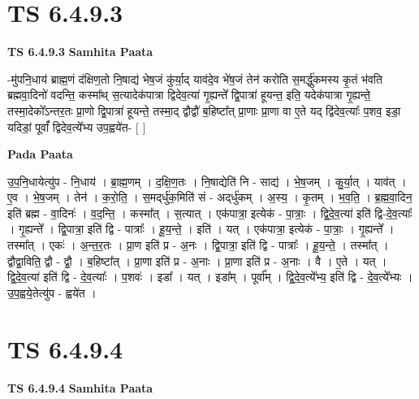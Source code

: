 \documentclass[17pt]{extarticle}
\begin{document}
\section*{ TS 6.4.9.3 }

\textbf{TS 6.4.9.3 } \newline
\textbf{Samhita Paata} \newline

-मु॑पनि॒धाय॑ ब्राह्म॒णं द॑क्षिण॒तो नि॒षाद्य॑ भेष॒जं कु॑र्या॒द् याव॑दे॒व भे॑ष॒जं तेन॑ करोति स॒मर्द्धु॑कमस्य कृ॒तं भ॑वति ब्रह्मवा॒दिनो॑ वदन्ति॒  कस्मा᳚थ् स॒त्यादेक॑पात्रा द्विदेव॒त्या॑ गृ॒ह्यन्ते᳚ द्वि॒पात्रा॑ हूयन्त॒ इति॒ यदेक॑पात्रा गृ॒ह्यन्ते॒ तस्मा॒देको᳚ऽन्तर॒तः प्रा॒णो द्वि॒पात्रा॑ हूयन्ते॒ तस्मा॒द् द्वौद्वौ॑ ब॒हिष्टा᳚त् प्रा॒णाः प्रा॒णा वा ए॒ते यद् द्वि॑देव॒त्याः᳚ प॒शव॒ इडा॒ यदिडां॒ पूर्वां᳚ द्विदेव॒त्ये᳚भ्य उप॒ह्वये॑त- [  ] \newline

\textbf{Pada Paata} \newline

उ॒प॒नि॒धायेत्यु॑प - नि॒धाय॑ । ब्रा॒ह्म॒णम् । द॒क्षि॒ण॒तः । नि॒षाद्येति॑ नि - साद्य॑ । भे॒ष॒जम् । कु॒र्या॒त् । याव॑त् । ए॒व । भे॒ष॒जम् । तेन॑ । क॒रो॒ति॒ । स॒मद्‌र्धु॑क॒मिति॑ सं - अद्‌र्धु॑कम् । अ॒स्य॒ । कृ॒तम् । भ॒व॒ति॒ । ब्र॒ह्म॒वा॒दिन॒ इति॑ ब्रह्म - वा॒दिनः॑ । व॒द॒न्ति॒ । कस्मा᳚त् । स॒त्यात् । एक॑पात्रा॒ इत्येक॑ - पा॒त्राः॒ । द्वि॒दे॒व॒त्या॑ इति॑ द्वि-दे॒व॒त्याः᳚ । गृ॒ह्यन्ते᳚ । द्वि॒पात्रा॒ इति॑ द्वि - पात्राः᳚ । हू॒य॒न्ते॒ । इति॑ । यत् । एक॑पात्रा॒ इत्येक॑ - पा॒त्राः॒ । गृ॒ह्यन्ते᳚ । तस्मा᳚त् । एकः॑ । अ॒न्त॒र॒तः । प्रा॒ण इति॑ प्र - अ॒नः । द्वि॒पात्रा॒ इति॑ द्वि - पात्राः᳚ । हू॒य॒न्ते॒ । तस्मा᳚त् । द्वौद्वा॒विति॒ द्वौ - द्वौ॒ । ब॒हिष्टा᳚त् । प्रा॒णा इति॑ प्र - अ॒नाः । प्रा॒णा इति॑ प्र - अ॒नाः । वै । ए॒ते । यत् । द्वि॒दे॒व॒त्या॑ इति॑ द्वि - दे॒व॒त्याः᳚ । प॒शवः॑ । इडा᳚ । यत् । इडा᳚म् । पूर्वा᳚म् । द्वि॒दे॒व॒त्ये᳚भ्य॒ इति॑ द्वि - दे॒व॒त्ये᳚भ्यः । उ॒प॒ह्वये॒तेत्यु॑प - ह्वये॑त ।  \newline




\section*{ TS 6.4.9.4 }

\textbf{TS 6.4.9.4 } \newline
\textbf{Samhita Paata} \newline
\end{document}
